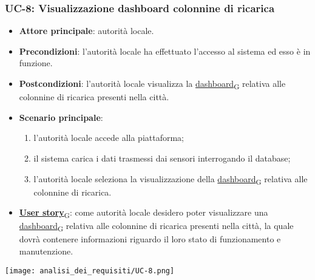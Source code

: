 \subsubsection{UC-8: Visualizzazione dashboard colonnine di ricarica}
\begin{itemize}
	\item \textbf{Attore principale}: autorità locale.
	\item \textbf{Precondizioni}: l'autorità locale ha effettuato l'accesso al sistema ed esso è in funzione.
	\item \textbf{Postcondizioni}: l'autorità locale visualizza la \href{https://7last.github.io/docs/pb/documentazione-interna/glossario\#dashboard}{dashboard\textsubscript{G}} relativa
	      alle colonnine di ricarica presenti nella città.
	\item \textbf{Scenario principale}:
	      \begin{enumerate}
		      \item l'autorità locale accede alla piattaforma;
		      \item il sistema carica i dati trasmessi dai sensori interrogando il database;
		      \item l'autorità locale seleziona la visualizzazione della \href{https://7last.github.io/docs/pb/documentazione-interna/glossario\#dashboard}{dashboard\textsubscript{G}} relativa alle colonnine di ricarica.
	      \end{enumerate}
	\item \href{https://7last.github.io/docs/pb/documentazione-interna/glossario\#user-story}{\textbf{User story}\textsubscript{G}}:
	      come autorità locale desidero poter visualizzare una \href{https://7last.github.io/docs/pb/documentazione-interna/glossario\#dashboard}{dashboard\textsubscript{G}} relativa alle colonnine di ricarica presenti nella città, la quale
	      dovrà contenere informazioni riguardo il loro stato di funzionamento e manutenzione.
\end{itemize}
\begin{center}
	\texttt{[image: analisi\_dei\_requisiti/UC-8.png]}
\end{center}


